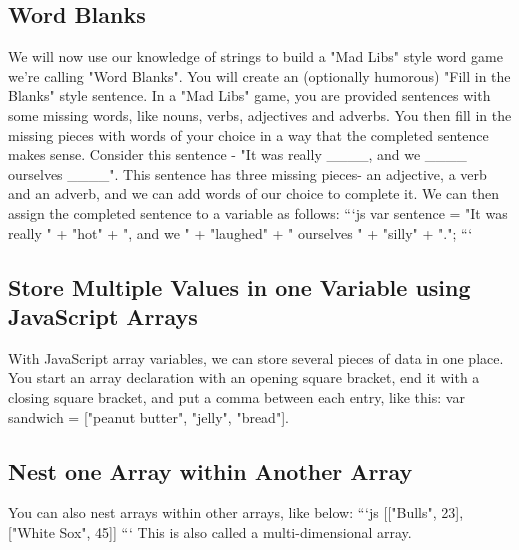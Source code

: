 \documentclass{article}%
\begin{document}
%
\subsection{Word Blanks}%
\label{subsec:WordBlanks}%
We will now use our knowledge of strings to build a "Mad Libs" style word game we're calling "Word Blanks". You will create an (optionally humorous) "Fill in the Blanks" style sentence.\newline%
In a "Mad Libs" game, you are provided sentences with some missing words, like nouns, verbs, adjectives and adverbs. You then fill in the missing pieces with words of your choice in a way that the completed sentence makes sense.\newline%
Consider this sentence {-} "It was really \_\_\_\_, and we \_\_\_\_ ourselves \_\_\_\_". This sentence has three missing pieces{-} an adjective, a verb and an adverb, and we can add words of our choice to complete it. We can then assign the completed sentence to a variable as follows:\newline%
```js\newline%
var sentence = "It was really " + "hot" + ", and we " + "laughed" + " ourselves " + "silly" + ".";\newline%
```\newline%

%
\subsection{Store Multiple Values in one Variable using JavaScript Arrays}%
\label{subsec:StoreMultipleValuesinoneVariableusingJavaScriptArrays}%
With JavaScript array variables, we can store several pieces of data in one place.\newline%
You start an array declaration with an opening square bracket, end it with a closing square bracket, and put a comma between each entry, like this:\newline%
var sandwich = {[}"peanut butter", "jelly", "bread"{]}.\newline%

%
\subsection{Nest one Array within Another Array}%
\label{subsec:NestoneArraywithinAnotherArray}%
You can also nest arrays within other arrays, like below:\newline%
```js\newline%
{[}{[}"Bulls", 23{]}, {[}"White Sox", 45{]}{]}\newline%
```\newline%
This is also called a multi{-}dimensional array.\newline%
\end{document}
